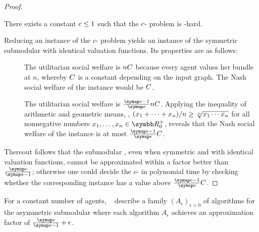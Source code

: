 \begin{proof}
	\begin{proposition}
		There exists a constant \(c \le 1\) such that the \(c\)-\Gap{} problem is \NP\kern1.5pt-hard.
	\end{proposition}

	\medskip
	Reducing an instance of the \(c\)-\Gap{} problem yields an instance of the symmetric submodular \USW{} with identical valuation functions.
	Its properties are as follows:
	\begin{description}
		\item[\Yes]
		The utilitarian social welfare is \(n C\) because every agent values her bundle at \(n\), whereby \(C\) is a constant depending on the input graph.
		The Nash social welfare of the instance would be \(C\).

		\item[\No]
		The utilitarian social welfare is \(\smash{\afinv} n \USWconstant\).
		Applying the inequality of arithmetic and geometric means, \ie{}, \((x_1 + \dots + x_n)/n \ge \smash{\sqrt[n]{x_1 \dotsm x_n}}\) for all nonnegative numbers \(x_1, \dots, x_n \in \realposzero\), reveals that the Nash social welfare of the instance is at most \(\afinv \USWconstant\).
	\end{description}
	Thereout follows that the submodular \NSW{}, even when symmetric and with identical valuation functions, cannot be approximated within a factor better than \(\af\);
	otherwise one could decide the \(c\)-\Gap{} in polynomial time by checking whether the corresponding \NSW{} instance has a value above \(\afinv \USWconstant\).
\end{proof}

For a constant number of agents, \citeauthor{APNSWuSVþUM}~\cite[Section 5.1]{APNSWuSVþUM} describe a family \((A_{\epsilon})_{\epsilon > 0}\) of algorithms for the asymmetric submodular \NSW{} where each algorithm \(A_\epsilon\) achieves an approximation factor of \(\af + \epsilon\).

